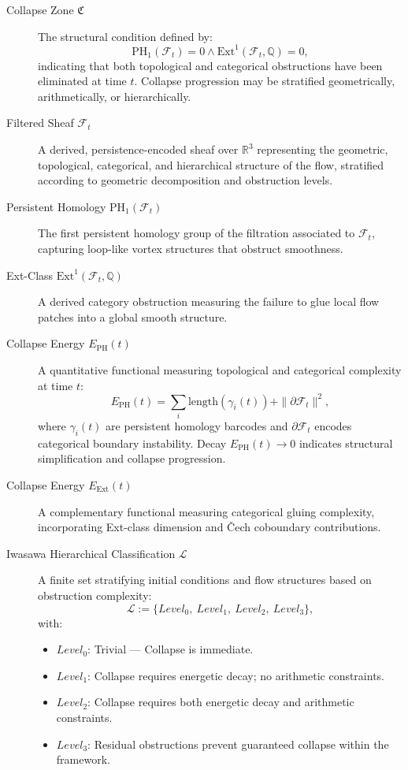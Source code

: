 \documentclass[11pt]{article}
\begin{document}
\begin{description}

  \item[Collapse Zone $\mathfrak{C}$]  
  The structural condition defined by:
  \[
  \mathrm{PH}_1(\mathcal{F}_t) = 0 \land \mathrm{Ext}^1(\mathcal{F}_t, \mathbb{Q}) = 0,
  \]
  indicating that both topological and categorical obstructions have been eliminated at time $t$. Collapse progression may be stratified geometrically, arithmetically, or hierarchically.

  \item[Filtered Sheaf $\mathcal{F}_t$]  
  A derived, persistence-encoded sheaf over $\mathbb{R}^3$ representing the geometric, topological, categorical, and hierarchical structure of the flow, stratified according to geometric decomposition and obstruction levels.

  \item[Persistent Homology $\mathrm{PH}_1(\mathcal{F}_t)$]  
  The first persistent homology group of the filtration associated to $\mathcal{F}_t$, capturing loop-like vortex structures that obstruct smoothness.

  \item[Ext-Class $\mathrm{Ext}^1(\mathcal{F}_t, \mathbb{Q})$]  
  A derived category obstruction measuring the failure to glue local flow patches into a global smooth structure.

  \item[Collapse Energy $E_{\mathrm{PH}}(t)$]  
  A quantitative functional measuring topological and categorical complexity at time $t$:
  \[
  E_{\mathrm{PH}}(t) = \sum_i \mathrm{length}(\gamma_i(t)) + \|\partial \mathcal{F}_t\|^2,
  \]
  where $\gamma_i(t)$ are persistent homology barcodes and $\partial \mathcal{F}_t$ encodes categorical boundary instability. Decay $E_{\mathrm{PH}}(t) \to 0$ indicates structural simplification and collapse progression.

  \item[Collapse Energy $E_{\mathrm{Ext}}(t)$]  
  A complementary functional measuring categorical gluing complexity, incorporating Ext-class dimension and Čech coboundary contributions.

  \item[Iwasawa Hierarchical Classification $\mathcal{L}$]  
  A finite set stratifying initial conditions and flow structures based on obstruction complexity:
  \[
  \mathcal{L} := \{ Level_0,\ Level_1,\ Level_2,\ Level_3 \},
  \]
  with:
  \begin{itemize}
    \item $Level_0$: Trivial — Collapse is immediate.
    \item $Level_1$: Collapse requires energetic decay; no arithmetic constraints.
    \item $Level_2$: Collapse requires both energetic decay and arithmetic constraints.
    \item $Level_3$: Residual obstructions prevent guaranteed collapse within the framework.
  \end{itemize}


\end{description}
\end{document}
